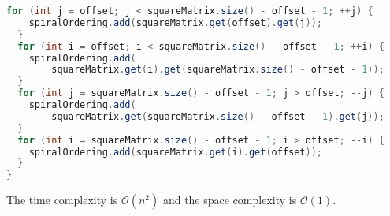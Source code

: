 \documentclass[10pt,openany,twoside,letterpaper,extrafontsizes]{memoir}
\newif\ifPython
\newcommand{\myindex}[1]{%
\index[terms]{#1}%
}
\begin{document}
\begin{Spacing}{\arraysSpacing}
\begin{lstlisting}[language=Java]
  for (int j = offset; j < squareMatrix.size() - offset - 1; ++j) {
    spiralOrdering.add(squareMatrix.get(offset).get(j));
  }
  for (int i = offset; i < squareMatrix.size() - offset - 1; ++i) {
    spiralOrdering.add(
        squareMatrix.get(i).get(squareMatrix.size() - offset - 1));
  }
  for (int j = squareMatrix.size() - offset - 1; j > offset; --j) {
    spiralOrdering.add(
        squareMatrix.get(squareMatrix.size() - offset - 1).get(j));
  }
  for (int i = squareMatrix.size() - offset - 1; i > offset; --i) {
    spiralOrdering.add(squareMatrix.get(i).get(offset));
  }
}
\end{lstlisting}
\fi%
\ifPython
\begin{lstlisting}[language=Python]
def matrix_in_spiral_order(square_matrix):
    def matrix_layer_in_clockwise(offset):
        if offset == len(square_matrix) - offset - 1:
            # square_matrix has odd dimension, and we are at the center of the
            # matrix square_matrix.
            spiral_ordering.append(square_matrix[offset][offset])
            return

        spiral_ordering.extend(square_matrix[offset][offset:-1 - offset])
        spiral_ordering.extend(
            list(zip(*square_matrix))[-1 - offset][offset:-1 - offset])
        spiral_ordering.extend(
            square_matrix[-1 - offset][-1 - offset:offset:-1])
        spiral_ordering.extend(
            list(zip(*square_matrix))[offset][-1 - offset:offset:-1])

    spiral_ordering = []
    for offset in range((len(square_matrix) + 1) // 2):
        matrix_layer_in_clockwise(offset)
    return spiral_ordering
\end{lstlisting}
\fi%

\ifPython
The time complexity is $\mathcal{O}(n^2)$.
\else
The time complexity is $\mathcal{O}(n^2)$ and the space complexity is \myindex{$\mathcal{O}(1)$ space}$\mathcal{O}(1)$.
\fi


\end{Spacing}
\end{document}
